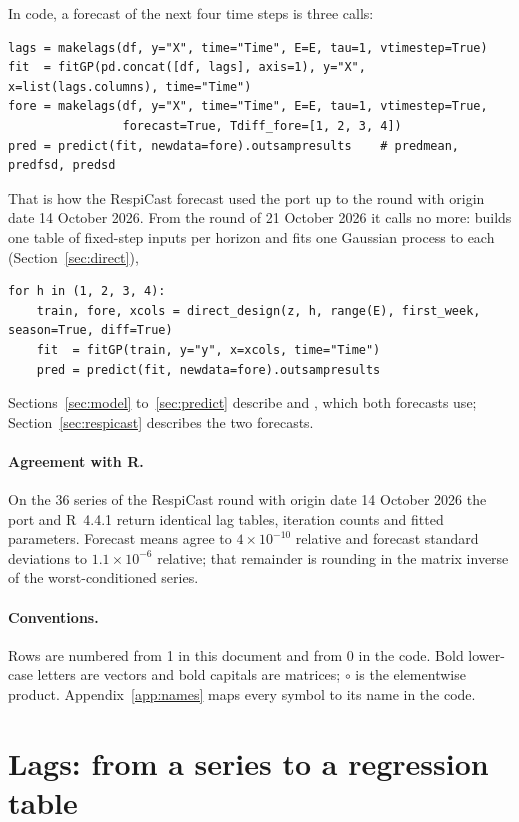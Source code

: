 \documentclass[11pt,a4paper]{article}
\newcommand{\code}[1]{\texttt{\detokenize{#1}}}
\numberwithin{equation}{section}
\begin{document}
In code, a forecast of the next four time steps is three calls:
\begin{lstlisting}
lags = makelags(df, y="X", time="Time", E=E, tau=1, vtimestep=True)
fit  = fitGP(pd.concat([df, lags], axis=1), y="X", x=list(lags.columns), time="Time")
fore = makelags(df, y="X", time="Time", E=E, tau=1, vtimestep=True,
                forecast=True, Tdiff_fore=[1, 2, 3, 4])
pred = predict(fit, newdata=fore).outsampresults    # predmean, predfsd, predsd
\end{lstlisting}
That is how the RespiCast forecast used the port up to the round with origin date 14 October 2026.
From the round of 21 October 2026 it calls \code{makelags} no more: \code{gpedm_direct.py} builds one
table of fixed-step inputs per horizon and fits one Gaussian process to each
(Section~\ref{sec:direct}),
\begin{lstlisting}
for h in (1, 2, 3, 4):
    train, fore, xcols = direct_design(z, h, range(E), first_week, season=True, diff=True)
    fit  = fitGP(train, y="y", x=xcols, time="Time")
    pred = predict(fit, newdata=fore).outsampresults
\end{lstlisting}
Sections~\ref{sec:model} to~\ref{sec:predict} describe \code{fitGP} and \code{predict}, which both
forecasts use; Section~\ref{sec:respicast} describes the two forecasts.

\paragraph{Agreement with R.} On the 36 series of the RespiCast round with origin date 14 October 2026
the port and R~4.4.1 return identical lag tables, iteration counts and fitted parameters. Forecast
means agree to $4\times10^{-10}$ relative and forecast standard deviations to $1.1\times10^{-6}$
relative; that remainder is rounding in the matrix inverse of the worst-conditioned series.

\paragraph{Conventions.} Rows are numbered from 1 in this document and from 0 in the code. Bold
lower-case letters are vectors and bold capitals are matrices; $\circ$ is the elementwise product.
Appendix~\ref{app:names} maps every symbol to its name in the code.

\section{Lags: from a series to a regression table}
\label{sec:lags}
\end{document}
